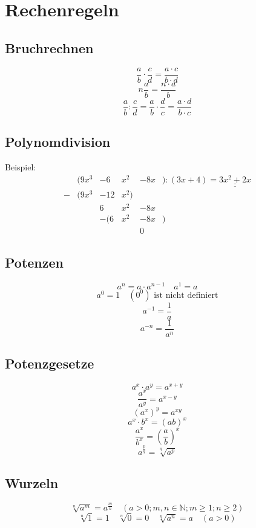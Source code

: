 \section{Rechenregeln}
\subsection{Bruchrechnen}
\[ \boxed{\frac{a}{b} \cdot \frac{c}{d} = \frac{a \cdot c}{b \cdot d}} \]
\[ \boxed{n \frac{a}{b} = \frac{n \cdot a}{b}} \]
\[ \boxed{\frac{a}{b} : \frac{c}{d} = \frac{a}{b} \cdot \frac{d}{c} = \frac{a \cdot d}{b \cdot c}} \]

\subsection{Polynomdivision}
Beispiel: 
\[ \boxed{\begin{array}{rrrlrl}
&(9x^3 &- 6&x^2 &- 8x&):(3x + 4) = \underline{\underline{3x^2 + 2x}}\\
-&(9x^3 &- 12&x^2)&&\\
&&6&x^2 &- 8x&\\
&&-(6&x^2 &- 8x&)\\
&&&&0&
\end{array}} \]

\subsection{Potenzen}
\[ \boxed{a^n = a \cdot a^{n-1} \quad a^1 = a} \]
\[ \boxed{a^0 = 1 \quad \left(0^0\right)\text{ ist nicht definiert}} \]
\[ \boxed{a^{-1} = \frac{1}{a}} \]
\[ \boxed{a^{-n} = \frac{1}{a^n}} \]

\subsection{Potenzgesetze}
\[ \boxed{a^x \cdot a^y = a^{x+y}} \]
\[ \boxed{\frac{a^x}{a^y} = a^{x-y}} \]
\[ \boxed{(a^x)^y = a^{xy}} \]
\[ \boxed{a^x \cdot b^x = \left(ab\right)^x} \]
\[ \boxed{\frac{a^x}{b^x} = \left(\frac{a}{b}\right)^x} \]
\[ \boxed{a^{\frac{p}{q}} = \sqrt[q]{a^p}} \]

\subsection{Wurzeln}
\[ \boxed{\sqrt[n]{a^m} = a^{\frac{m}{n}} \quad \left(a>0; m, n \in \mathbb{N}; m \geq 1; n \geq 2\right)} \]
\[ \boxed{\sqrt[n]{1}=1 \quad \sqrt[n]{0}=0 \quad \sqrt[n]{a^n}=a \quad \left(a>0\right)} \]

